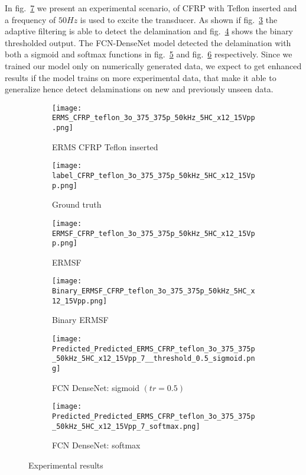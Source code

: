 	In fig.~\ref{fig:Exp_ERMS_teflon} we present an experimental scenario, of CFRP with Teflon inserted and a frequency of \(50 Hz\) is used to excite the transducer.
	As shown if fig.~\ref{fig:ERMSF_CFRP_teflon} the adaptive filtering is able to detect the delamination and fig.~\ref{fig:Binary_ERMSF_CFRP} shows the binary thresholded output. 
	The FCN-DenseNet model detected the delamination with both a sigmoid and softmax functions in fig.~\ref{fig:EXP_predict_sigmoid} and fig.~\ref{fig:EXP_predict_softmax} respectively.
	Since we  trained our model only on numerically generated data, 
	we expect to get enhanced results if the model trains on more experimental data, that make it able to generalize hence detect delaminations on new and previously unseen data.
	\begin{figure} [H]
		\centering
		\begin{subfigure}[b]{0.47\textwidth}
			\centering
			\texttt{[image: ERMS\_CFRP\_teflon\_3o\_375\_375p\_50kHz\_5HC\_x12\_15Vpp.png]}
			\caption{ERMS CFRP Teflon inserted}
			\label{fig:Delamination}
		\end{subfigure}			
		\hfill
		\begin{subfigure}[b]{0.47\textwidth}
			\centering 	
			\texttt{[image: label\_CFRP\_teflon\_3o\_375\_375p\_50kHz\_5HC\_x12\_15Vpp.png]}
			\caption{Ground truth} 
			\label{fig:damage_label}
		\end{subfigure}
		\hfill
		\begin{subfigure}[b]{0.47\textwidth}
			\centering
			\texttt{[image: ERMSF\_CFRP\_teflon\_3o\_375\_375p\_50kHz\_5HC\_x12\_15Vpp.png]}
			\caption{ERMSF} 
			\label{fig:ERMSF_CFRP_teflon}
		\end{subfigure}
		\hfill
		\begin{subfigure}[b]{0.47\textwidth}
		\centering
		\texttt{[image: Binary\_ERMSF\_CFRP\_teflon\_3o\_375\_375p\_50kHz\_5HC\_x12\_15Vpp.png]}
		\caption{Binary ERMSF} 
		\label{fig:Binary_ERMSF_CFRP}
		\end{subfigure}
		\hfill
		\begin{subfigure}[b]{0.47\textwidth}
			\centering
			\texttt{[image: Predicted\_Predicted\_ERMS\_CFRP\_teflon\_3o\_375\_375p\_50kHz\_5HC\_x12\_15Vpp\_7\_\_threshold\_0.5\_sigmoid.png]}
			\caption{FCN DenseNet: sigmoid \((tr = 0.5)\)} 
			\label{fig:EXP_predict_sigmoid}
		\end{subfigure}
		\hfill
		\begin{subfigure}[b]{0.47\textwidth}
			\centering
			\texttt{[image: Predicted\_Predicted\_ERMS\_CFRP\_teflon\_3o\_375\_375p\_50kHz\_5HC\_x12\_15Vpp\_7\_softmax.png]}
			\caption{FCN DenseNet: softmax} 
			\label{fig:EXP_predict_softmax}
		\end{subfigure}
			\caption{Experimental results}
			\label{fig:Exp_ERMS_teflon}
		\end{figure}

	
